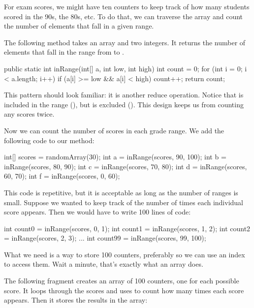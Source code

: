 For exam scores, we might have ten counters to keep track of how many students scored in the 90s, the 80s, etc.
To do that, we can traverse the array and count the number of elements that fall in a given range.

The following method takes an array and two integers.
It returns the number of elements that fall in the range from  to .

\begin{code}
public static int inRange(int[] a, int low, int high) {
    int count = 0;
    for (int i = 0; i < a.length; i++) {
        if (a[i] >= low && a[i] < high) {
            count++;
        }
    }
    return count;
}
\end{code}


This pattern should look familiar: it is another reduce operation.
Notice that  is included in the range (\java{>=}), but  is excluded (\java{<}).
This design keeps us from counting any scores twice.

Now we can count the number of scores in each grade range.
We add the following code to our  method:

\begin{code}
int[] scores = randomArray(30);
int a = inRange(scores, 90, 100);
int b = inRange(scores, 80, 90);
int c = inRange(scores, 70, 80);
int d = inRange(scores, 60, 70);
int f = inRange(scores, 0, 60);
\end{code}

This code is repetitive, but it is acceptable as long as the number of ranges is small.
Suppose we wanted to keep track of the number of times each individual score appears.
Then we would have to write 100 lines of code:

\begin{code}
int count0 = inRange(scores, 0, 1);
int count1 = inRange(scores, 1, 2);
int count2 = inRange(scores, 2, 3);
...
int count99 = inRange(scores, 99, 100);
\end{code}

What we need is a way to store 100 counters, preferably so we can use an index to access them.
Wait a minute, that's exactly what an array does.

The following fragment creates an array of 100 counters, one for each possible score.
It loops through the scores and uses  to count how many times each score appears.
Then it stores the results in the  array:

